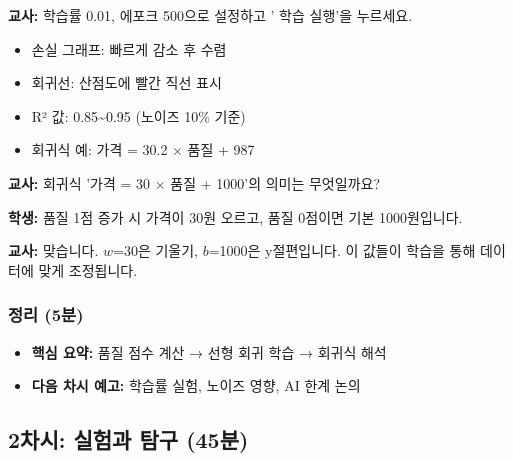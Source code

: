 \documentclass[11pt,a4paper]{article}
\begin{document}
\begin{tcolorbox}[colback=lightgray,colframe=gray,title=\textbf{【첫 학습 실행 - 15분】}]
 \textbf{교사:} 학습률 0.01, 에포크 500으로 설정하고 ' 학습 실행'을 누르세요.

\vspace{0.3cm}
\begin{tcolorbox}[colback=lightyellow,colframe=orange,title=\textbf{\texttwemoji{warning} 예상 결과}]
\begin{itemize}
    \item 손실 그래프: 빠르게 감소 후 수렴
    \item 회귀선: 산점도에 빨간 직선 표시
    \item R² 값: 0.85\textasciitilde0.95 (노이즈 10\% 기준)
    \item 회귀식 예: 가격 = 30.2 × 품질 + 987
\end{itemize}
\end{tcolorbox}
\end{tcolorbox}

\begin{tcolorbox}[colback=lightgray,colframe=gray,title=\textbf{【회귀식 해석 - 5분】}]
 \textbf{교사:} 회귀식 '가격 = 30 × 품질 + 1000'의 의미는 무엇일까요?

\vspace{0.2cm}
 \textbf{학생:} 품질 1점 증가 시 가격이 30원 오르고, 품질 0점이면 기본 1000원입니다.

\vspace{0.2cm}
 \textbf{교사:} 맞습니다. $w$=30은 기울기, $b$=1000은 y절편입니다. 이 값들이 학습을 통해 데이터에 맞게 조정됩니다.
\end{tcolorbox}

\subsubsection{정리 (5분)}

\begin{itemize}
    \item \textbf{핵심 요약:} 품질 점수 계산 → 선형 회귀 학습 → 회귀식 해석
    \item \textbf{다음 차시 예고:} 학습률 실험, 노이즈 영향, AI 한계 논의
\end{itemize}

\subsection{2차시: 실험과 탐구 (45분)}
\end{document}
